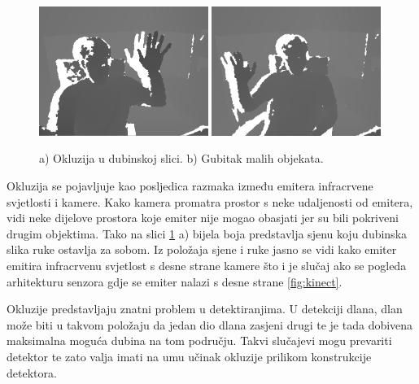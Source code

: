 \documentclass[times, utf8, diplomski, numeric]{fer}
\begin{document}
\begin{figure}[h!]
    \centering
    \includegraphics[width=0.49\textwidth]{detekcija/okluzija}    
    \includegraphics[width=0.49\textwidth]{detekcija/gubitak-malih-objekata}
	\caption{a) Okluzija u dubinskoj slici. b) Gubitak malih objekata.}
	\label{fig:oculsion}
\end{figure}

Okluzija se pojavljuje kao posljedica razmaka između emitera infracrvene svjetlosti i kamere. Kako kamera promatra prostor s neke udaljenosti od emitera, vidi neke dijelove prostora koje emiter nije mogao obasjati jer su bili pokriveni drugim objektima. Tako na slici \ref{fig:oculsion} a) bijela boja predstavlja sjenu koju dubinska slika ruke ostavlja za sobom. Iz položaja sjene i ruke jasno se vidi kako emiter emitira infracrvenu svjetlost s desne strane kamere što i je slučaj ako se pogleda arhitekturu senzora gdje se emiter nalazi s desne strane \ref{fig:kinect}.

Okluzije predstavljaju znatni problem u detektiranjima. U detekciji dlana, dlan može biti u takvom položaju da jedan dio dlana zasjeni drugi te je tada dobivena maksimalna moguća dubina na tom području. Takvi slučajevi mogu prevariti detektor te zato valja imati na umu učinak okluzije prilikom konstrukcije detektora.
\end{document}
